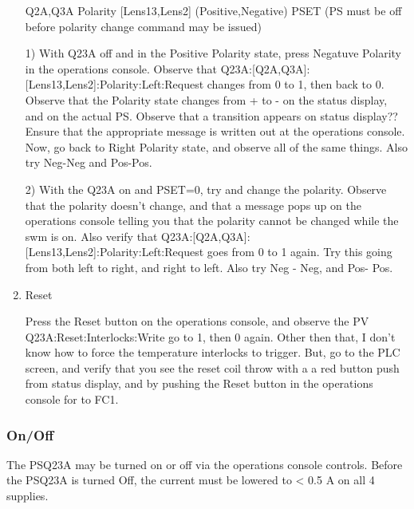 \documentclass[11pt]{book}		%
\begin{document}
\begin{enumerate}
 \item [Q2A,Q3A] Polarity [Lens13,Lens2] (Positive,Negative) PSET (PS must be off before polarity change command may be issued)

\color{red}

1) With Q23A off and in the Positive Polarity state, press Negatuve Polarity in the operations console. Observe that Q23A:[Q2A,Q3A]:[Lens13,Lens2]:Polarity:Left:Request changes from 0 to 1, then back to 0. Observe that the Polarity state changes from + to - on the status display, and on the actual PS. Observe that a transition appears on status display?? Ensure that the appropriate message is written out at the operations console. Now, go back to Right Polarity state, and observe all of the same things. Also try Neg-Neg and Pos-Pos.

2) With the Q23A on and PSET=0, try and change the polarity. Observe that the polarity doesn't change, and that a message pops up on the operations console telling you that the polarity cannot be changed while the swm is on. Also verify that Q23A:[Q2A,Q3A]:[Lens13,Lens2]:Polarity:Left:Request goes from 0 to 1 again. Try this going from both left to right, and right to left. Also try Neg - Neg, and Pos- Pos.


\color{black}

 \item Reset

\color{red}

Press the Reset button on the operations console, and observe the PV Q23A:Reset:Interlocks:Write go to 1, then 0 again. Other then that, I don't know how to force the temperature interlocks to trigger. But, go to the PLC screen, and verify that you see the reset coil throw with a a red button push from status display, and by pushing the Reset button in the operations console for to FC1.

\color{black}

\end{enumerate}

\subsubsection{On/Off} \label{sect:cyc-equip-ctl-beamline-quad23a-state-controls-on-off}

The PSQ23A may be turned on or off via the operations console controls. Before the PSQ23A is turned Off, the current must be lowered to < 0.5 A on all 4 supplies.

\color{red}
\end{document}
